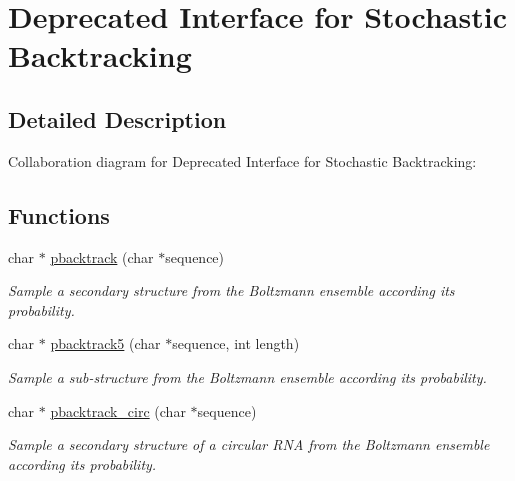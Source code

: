 \hypertarget{group__subopt__stochbt__deprecated}{}\section{Deprecated Interface for Stochastic Backtracking}
\label{group__subopt__stochbt__deprecated}


\subsection{Detailed Description}
Collaboration diagram for Deprecated Interface for Stochastic Backtracking\+:
\subsection*{Functions}
\begin{DoxyCompactItemize}
\item 
char $\ast$ \mbox{\hyperlink{group__subopt__stochbt__deprecated_gac03ca6db186bb3bf0a2a326d7fb3ba03}{pbacktrack}} (char $\ast$sequence)
\begin{DoxyCompactList}\small\item\em Sample a secondary structure from the Boltzmann ensemble according its probability. \end{DoxyCompactList}\item 
\mbox{\label{group__subopt__stochbt__deprecated_gaf2e614b8beb4ddf3e8751433b76f39db}} 
char $\ast$ \mbox{\hyperlink{group__subopt__stochbt__deprecated_gaf2e614b8beb4ddf3e8751433b76f39db}{pbacktrack5}} (char $\ast$sequence, int length)
\begin{DoxyCompactList}\small\item\em Sample a sub-\/structure from the Boltzmann ensemble according its probability. \end{DoxyCompactList}\item 
char $\ast$ \mbox{\hyperlink{group__subopt__stochbt__deprecated_ga00474051204ac9ad576b3e45174d03ff}{pbacktrack\+\_\+circ}} (char $\ast$sequence)
\begin{DoxyCompactList}\small\item\em Sample a secondary structure of a circular R\+NA from the Boltzmann ensemble according its probability. \end{DoxyCompactList}\end{DoxyCompactItemize}

